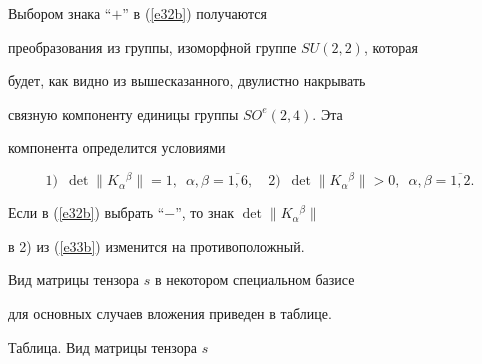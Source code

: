 Выбором знака ``$+$'' в (\ref{e32b}) получаются


преобразования из группы, изоморфной группе $SU(2,2)$, которая


будет, как видно из вышесказанного, двулистно накрывать


связную компоненту единицы группы $SO^e(2,4)$. Эта


компонента определится условиями


\begin{equation}


\label{e33b} 


1)\ \; \det\|K_\alpha{}^\beta\|=1,\ \; \alpha ,\beta=\overline{1,6},\quad


2)\ \; \det\|K_\alpha{}^\beta\|>0,\ \; \alpha ,\beta=\overline{1,2}.


\end{equation}


Если в (\ref{e32b}) выбрать ``$-$'', то знак $\det\| K_\alpha{}^\beta\|$


в 2) из (\ref{e33b}) изменится на противоположный.


Вид матрицы тензора $s$ в некотором специальном базисе


для основных случаев вложения приведен в таблице. %


\pagebreak





\begin{center}


Таблица. Вид матрицы тензора $s$


\end{center}


\medskip











